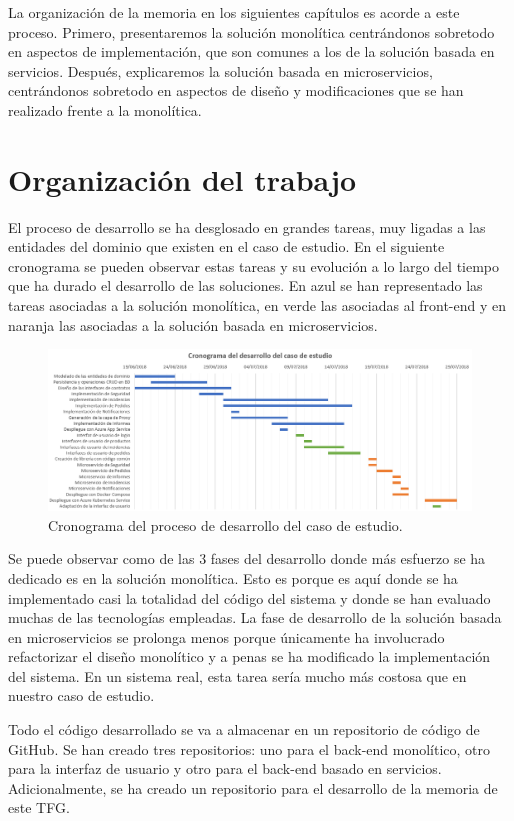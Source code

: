 \documentclass[11pt,spanish,listoffigures]{tfgetsinf}
\begin{document}
La organización de la memoria en los siguientes capítulos es acorde a este proceso. Primero, presentaremos la solución monolítica centrándonos sobretodo en aspectos de implementación, que son comunes a los de la solución basada en servicios. Después, explicaremos la solución basada en microservicios, centrándonos sobretodo en aspectos de diseño y modificaciones que se han realizado frente a la monolítica.

\section{Organización del trabajo}

El proceso de desarrollo se ha desglosado en grandes tareas, muy ligadas a las entidades del dominio que existen en el caso de estudio. En el siguiente cronograma se pueden observar estas tareas y su evolución a lo largo del tiempo que ha durado el desarrollo de las soluciones. En azul se han representado las tareas asociadas a la solución monolítica, en verde las asociadas al front-end y en naranja las asociadas a la solución basada en microservicios.

\begin{figure}[h]
\centering
\includegraphics[scale=0.5]{Cronograma}
\caption{Cronograma del proceso de desarrollo del caso de estudio.}
\end{figure}

Se puede observar como de las 3 fases del desarrollo donde más esfuerzo se ha dedicado es en la solución monolítica. Esto es porque es aquí donde se ha implementado casi la totalidad del código del sistema y donde se han evaluado muchas de las tecnologías empleadas. La fase de desarrollo de la solución basada en microservicios se prolonga menos porque únicamente ha involucrado refactorizar el diseño monolítico y a penas se ha modificado la implementación del sistema. En un sistema real, esta tarea sería mucho más costosa que en nuestro caso de estudio.

Todo el código desarrollado se va a almacenar en un repositorio de código de GitHub. Se han creado tres repositorios: uno para el back-end monolítico, otro para la interfaz de usuario y otro para el back-end basado en servicios. Adicionalmente, se ha creado un repositorio para el desarrollo de la memoria de este TFG.
\end{document}
